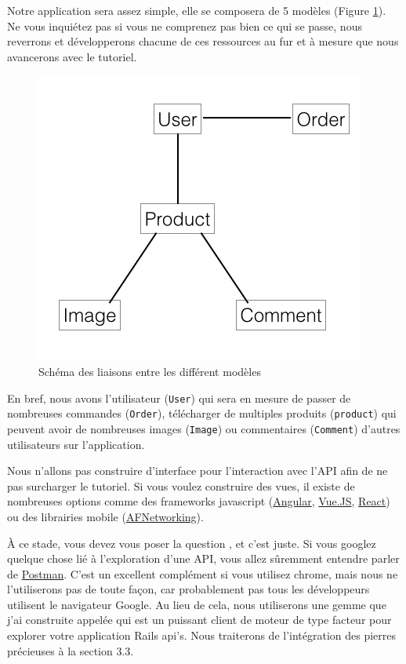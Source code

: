 \documentclass[]{report}
\begin{document}
    Notre application sera assez simple, elle se composera de 5 modèles (Figure \ref{fig:data_model}). Ne vous inquiétez pas si vous ne comprenez pas bien ce qui se passe, nous reverrons et développerons chacune de ces ressources au fur et à mesure que nous avancerons avec le tutoriel.

    \begin{figure}
      \includegraphics[width=\linewidth]{img/data_model.png}
      \caption{Schéma des liaisons entre les différent modèles}
      \label{fig:data_model}
    \end{figure}

    En bref, nous avons l'utilisateur (\verb|User|) qui sera en mesure de passer de nombreuses commandes (\verb|Order|), télécharger de multiples produits (\verb|product|) qui peuvent avoir de nombreuses images (\verb|Image|) ou commentaires (\verb|Comment|) d'autres utilisateurs sur l'application.

    Nous n'allons pas construire d'interface pour l'interaction avec l'API afin de ne pas surcharger le tutoriel.  Si vous voulez construire des vues, il existe de nombreuses options comme des frameworks javascript (\href{https://angularjs.org/}{Angular}, \href{https://vuejs.org/}{Vue.JS}, \href{https://reactjs.org/}{React}) ou des librairies mobile (\href{https://github.com/AFNetworking/AFNetworking}{AFNetworking}).

    À ce stade, vous devez vous poser la question , et c'est juste. Si vous googlez quelque chose lié à l'exploration d'une API, vous allez sûremment entendre parler de \href{https://www.getpostman.com/}{Postman}. C'est un excellent complément si vous utilisez chrome, mais nous ne l'utiliserons pas de toute façon, car probablement pas tous les développeurs utilisent le navigateur Google. Au lieu de cela, nous utiliserons une gemme que j'ai construite appelée  qui est un puissant client de moteur de type facteur pour explorer votre application Rails api's. Nous traiterons de l'intégration des pierres précieuses à la section 3.3.
\end{document}
